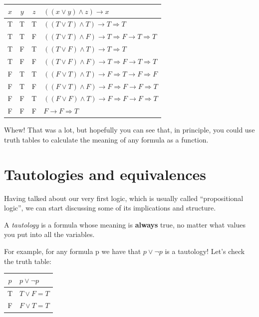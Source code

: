 \documentclass[11pt]{article}
\begin{document}
\begin{center}
\begin{tabular}{ccc|l}
\toprule
$x$ & $y$ & $z$ & $((x \vee y) \wedge z) \to x$ \\
\midrule
T & T & T & $((T \vee T) \wedge T) \to T \Longrightarrow T$ \\
T & T & F & $((T \vee T) \wedge F) \to T \Longrightarrow F \to T \Longrightarrow T$ \\
T & F & T & $((T \vee F) \wedge T) \to T \Longrightarrow T$ \\
T & F & F & $((T \vee F) \wedge F) \to T \Longrightarrow F \to T \Longrightarrow T$ \\
F & T & T & $((F \vee T) \wedge T) \to F \Longrightarrow T \to F \Longrightarrow F$ \\
F & T & F & $((F \vee T) \wedge F) \to F \Longrightarrow F \to F \Longrightarrow T$ \\
F & F & T & $((F \vee F) \wedge T) \to F \Longrightarrow F \to F \Longrightarrow T$ \\
F & F & F & $F \to F \Longrightarrow T$ \\
\bottomrule
\end{tabular}
\end{center}

Whew! That was a lot, but hopefully you can see that, in principle, you could use truth tables to calculate the meaning of any formula as a function.

\section{Tautologies and equivalences}
Having talked about our very first logic, which is usually called ``propositional logic'', we can start discussing some of its implications and structure.

\begin{definition}[Tautology]
A \emph{tautology} is a formula whose meaning is \textbf{always} true, no matter what values you put into all the variables.
\end{definition}

For example, for any formula p we have that $p \vee \lnot p$ is a tautology! Let's check the truth table:

\begin{center}
\begin{tabular}{c|l}
\toprule
$p$ & $p \vee \lnot p$ \\
\midrule
T & $T \vee F = T$ \\
F & $F \vee T = T$ \\
\bottomrule
\end{tabular}
\end{center}
\end{document}
